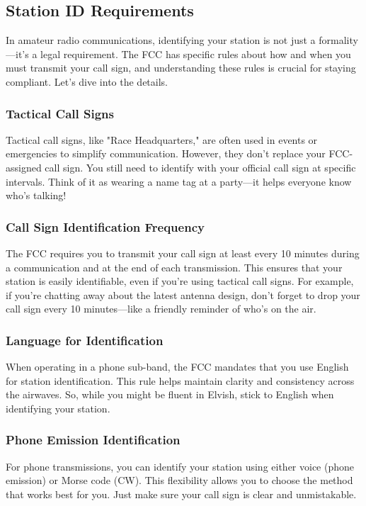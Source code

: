 \subsection{Station ID Requirements}
\label{subsec:id-requirements}

In amateur radio communications, identifying your station is not just a formality—it's a legal requirement. The FCC has specific rules about how and when you must transmit your call sign, and understanding these rules is crucial for staying compliant. Let's dive into the details.

\subsubsection*{Tactical Call Signs}
Tactical call signs, like "Race Headquarters," are often used in events or emergencies to simplify communication. However, they don't replace your FCC-assigned call sign. You still need to identify with your official call sign at specific intervals. Think of it as wearing a name tag at a party—it helps everyone know who's talking!

\subsubsection*{Call Sign Identification Frequency}
The FCC requires you to transmit your call sign at least every 10 minutes during a communication and at the end of each transmission. This ensures that your station is easily identifiable, even if you're using tactical call signs. For example, if you're chatting away about the latest antenna design, don't forget to drop your call sign every 10 minutes—like a friendly reminder of who's on the air.

\subsubsection*{Language for Identification}
When operating in a phone sub-band, the FCC mandates that you use English for station identification. This rule helps maintain clarity and consistency across the airwaves. So, while you might be fluent in Elvish, stick to English when identifying your station.

\subsubsection*{Phone Emission Identification}
For phone transmissions, you can identify your station using either voice (phone emission) or Morse code (CW). This flexibility allows you to choose the method that works best for you. Just make sure your call sign is clear and unmistakable.

